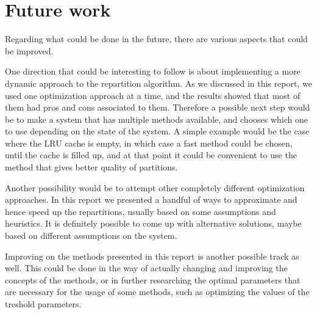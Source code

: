 \section{Future work}\label{sec:future-work}
Regarding what could be done in the future, there are various aspects that could be improved. 

One direction that could be interesting to follow is about implementing a more dynamic approach to the repartition algorithm. As we discussed in this report, we used one optimization approach at a time, and the results showed that most of them had pros and cons associated to them. Therefore a possible next step would be to make a system that has multiple methods available, and chooses which one to use depending on the state of the system. A simple example would be the case where the LRU cache is empty, in which case a fast method could be chosen, until the cache is filled up, and at that point it could be convenient to use the method that gives better quality of partitions.

Another possibility would be to attempt other completely different optimization approaches. In this report we presented a handful of ways to approximate and hence speed up the repartitions, usually based on some assumptions and heuristics. It is definitely possible to come up with alternative solutions, maybe based on different assumptions on the system.

Improving on the methods presented in this report is another possible track as well. This could be done in the way of actually changing and improving the concepts of the methods, or in further researching the optimal parameters that are necessary for the usage of some methods, such as optimizing the values of the treshold parameters.



